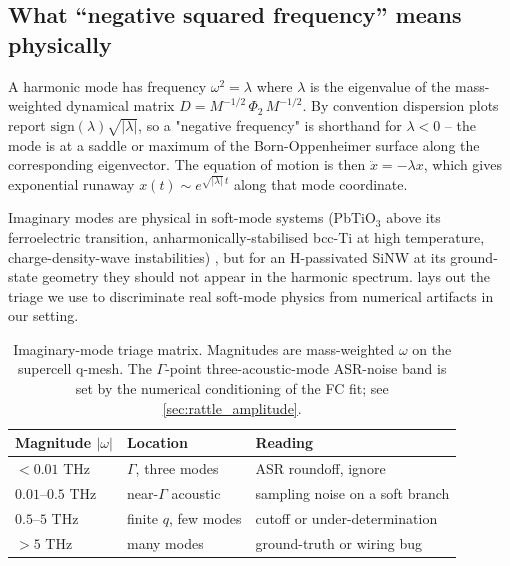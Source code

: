 \subsection{What ``negative squared frequency'' means physically}
\label{sec:imag_phys}

A harmonic mode has frequency $\omega^2 = \lambda$ where $\lambda$ is
the eigenvalue of the mass-weighted dynamical matrix
$D = M^{-1/2}\,\Phi_2\,M^{-1/2}$.  By convention dispersion plots
report $\mathrm{sign}(\lambda)\sqrt{|\lambda|}$, so a "negative
frequency" is shorthand for $\lambda < 0$ -- the mode is at a saddle
or maximum of the Born-Oppenheimer surface along the corresponding
eigenvector.  The equation of motion is then $\ddot{x} = -\lambda x$,
which gives exponential runaway $x(t) \sim e^{\sqrt{|\lambda|}\,t}$
along that mode coordinate.

Imaginary modes are physical in soft-mode systems (PbTiO$_3$ above its
ferroelectric transition, anharmonically-stabilised bcc-Ti at high
temperature, charge-density-wave instabilities)
\cite{tadano_first-principles_2018}, but for an H-passivated SiNW at its ground-state
geometry they should not appear in the harmonic spectrum.
 lays out the triage we use to discriminate
real soft-mode physics from numerical artifacts in our setting.

\begin{table}[ht]
  \centering
  \begin{tabular}{lll}
    \toprule
    Magnitude $|\omega|$ & Location & Reading \\
    \midrule
    $< 0.01$ THz & $\Gamma$, three modes & ASR roundoff, ignore \\
    $0.01$--$0.5$ THz & near-$\Gamma$ acoustic & sampling noise on a soft branch \\
    $0.5$--$5$ THz & finite $q$, few modes & cutoff or under-determination \\
    $> 5$ THz & many modes & ground-truth or wiring bug \\
    \bottomrule
  \end{tabular}
  \caption{Imaginary-mode triage matrix.  Magnitudes are mass-weighted
  $\omega$ on the supercell q-mesh.  The $\Gamma$-point three-acoustic-mode
  ASR-noise band is set by the numerical conditioning of the FC fit;
  see \cref{sec:rattle_amplitude}.}
  \label{tab:imag_mode_triage}
\end{table}

